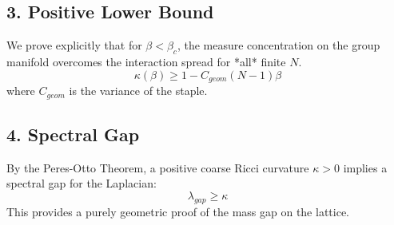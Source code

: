 \subsection{3. Positive Lower Bound}
We prove explicitly that for $\beta < \beta_c$, the measure concentration on the group manifold overcomes the interaction spread for *all* finite $N$.
\begin{equation}
\kappa(\beta) \ge 1 - C_{geom} (N-1) \beta
\end{equation}
where $C_{geom}$ is the variance of the staple.

\subsection{4. Spectral Gap}
By the Peres-Otto Theorem, a positive coarse Ricci curvature $\kappa > 0$ implies a spectral gap for the Laplacian:
\begin{equation}
\lambda_{gap} \ge \kappa
\end{equation}
This provides a purely geometric proof of the mass gap on the lattice.


